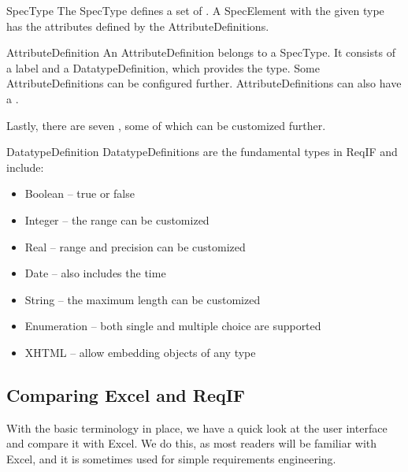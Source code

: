 \begin{definition}{SpecType}
The SpecType defines a set of .  A SpecElement with the given type has the attributes defined by the AttributeDefinitions.
\end{definition}

\begin{definition}{AttributeDefinition}
An AttributeDefinition belongs to a SpecType. It consists of a label and a DatatypeDefinition, which provides the type.  Some AttributeDefinitions can be configured further.  AttributeDefinitions can also have a .
\end{definition}

Lastly, there are seven , some of which can be customized further.

\begin{definition}{DatatypeDefinition}
DatatypeDefinitions are the fundamental types in ReqIF and include:

\begin{itemize}
\item Boolean -- true or false
\item Integer -- the range can be customized
\item Real -- range and precision can be customized
\item Date -- also includes the time
\item String -- the maximum length can be customized
\item Enumeration -- both single and multiple choice are supported
\item XHTML -- allow embedding objects of any type
\end{itemize}
\end{definition}

\subsection{Comparing Excel and ReqIF}

With the basic terminology in place, we have a quick look at the \pror{} user interface and compare it with Excel.  We do this, as most readers will be familiar with Excel, and it is sometimes used for simple requirements engineering. 

